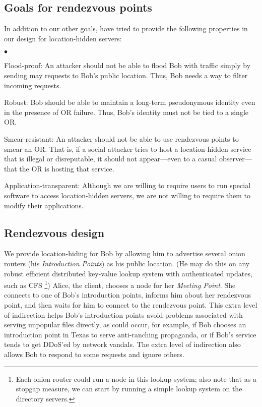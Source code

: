 \documentclass[times,10pt,twocolumn]{article}
\newenvironment{tightlist}{\begin{list}{$\bullet$}{
  \setlength{\itemsep}{0mm}
    \setlength{\parsep}{0mm}
    }}{\end{list}}
\begin{document}
\subsection{Goals for rendezvous points}
\label{subsec:rendezvous-goals}
In addition to our other goals, have tried to provide the following
properties in our design for location-hidden servers:
\begin{tightlist}
\item[Flood-proof:] An attacker should not be able to flood Bob with traffic
  simply by sending may requests to Bob's public location.  Thus, Bob needs a
  way to filter incoming requests.
\item[Robust:] Bob should be able to maintain a long-term pseudonymous
  identity even in the presence of OR failure.  Thus, Bob's identity must not
  be tied to a single OR.
\item[Smear-resistant:] An attacker should not be able to use rendezvous
  points to smear an OR.  That is, if a social attacker tries to host a 
  location-hidden service that is illegal or disreputable, it should not
  appear---even to a casual observer---that the OR is hosting that service.
\item[Application-transparent:] Although we are willing to require users to
  run special software to access location-hidden servers, we are not willing
  to require them to modify their applications.
\end{tightlist}

\subsection{Rendezvous design}
We provide location-hiding for Bob by allowing him to advertise
several onion routers (his \emph{Introduction Points}) as his public
location.  (He may do this on any robust efficient distributed
key-value lookup system with authenticated updates, such as CFS
\cite{cfs:sosp01}\footnote{
Each onion router could run a node in this lookup
system; also note that as a stopgap measure, we can start by running a
simple lookup system on the directory servers.})  
Alice, the client, chooses a node for her
\emph{Meeting Point}. She connects to one of Bob's introduction
points, informs him about her rendezvous point, and then waits for him
to connect to the rendezvous point. This extra level of indirection
helps Bob's introduction points avoid problems associated with serving
unpopular files directly, as could occur, for example, if Bob chooses
an introduction point in Texas to serve anti-ranching propaganda,
or if Bob's service tends to get DDoS'ed by network vandals.
The extra level of indirection also allows Bob to respond to some requests
and ignore others.
\end{document}
